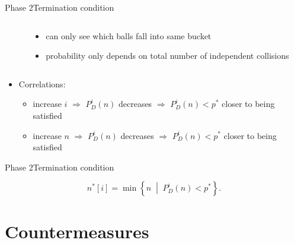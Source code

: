 \documentclass[aspectratio=169, hyperref={colorlinks=true, allcolors=SecondaryColor}, c]{beamer}
\begin{document}
	\begin{frame}[fragile]{Phase 2}{Termination condition}
		\begin{columns}
			\begin{column}{0.5\textwidth}

			\end{column}
			\begin{column}{0.5\textwidth}
				\begin{itemize}
					\item can only see which balls fall into same bucket
					\item probability only depends on \alert{total number of independent collisions}
				\end{itemize}
			\end{column}
		\end{columns}
		\begin{itemize}
			\item \alert{Correlations}:
			\begin{itemize}
				\item increase $i$ \alert{$\Rightarrow$} $P^i_D(n)$ decreases \alert{$\Rightarrow$} $P^i_D(n) < p^*$ closer to being satisfied %
				\item increase $n$ \alert{$\Rightarrow$} $P^i_D(n)$ decreases \alert{$\Rightarrow$} $P^i_D(n) < p^*$ closer to being satisfied %
			\end{itemize}
		\end{itemize}
	\end{frame}

	\begin{frame}[fragile]{Phase 2}{Termination condition}
		\begin{center}
		\end{center}
		\[
			n^*[i]
			=
			\min
			\left\{
			n
			\;\middle|\;
			P_D^i(n)
			<
			p^*
			\right\}.
		\]
	\end{frame}
\else
\fi

\ifcountermeasures
	\section{Countermeasures}
\end{document}
